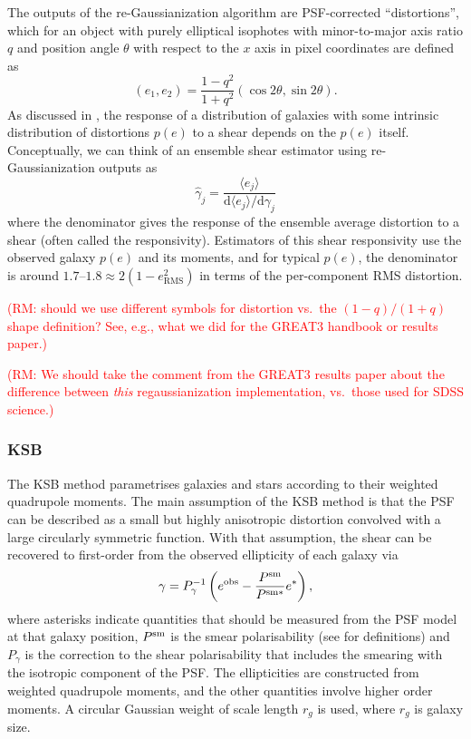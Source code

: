 \documentclass[iop]{emulateapj}
\newcommand\rmcomment[1]{\textcolor{red}{(RM: #1)}}
\begin{document}
The outputs of the re-Gaussianization algorithm are PSF-corrected
``distortions'', which for an object with purely elliptical isophotes
with minor-to-major axis ratio $q$ and position angle $\theta$ with
respect to the $x$ axis in pixel coordinates are defined as
\begin{equation}
(e_1, e_2) = \frac{1-q^2}{1+q^2}\left(\cos{2\theta},\sin{2\theta}\right).
\end{equation}
As discussed in \cite{2002AJ....123..583B}, the response of a
distribution of galaxies with some intrinsic distribution of
distortions $p(e)$ to a shear %
depends on
the $p(e)$ itself.  Conceptually, we can think of an ensemble shear
estimator using re-Gaussianization outputs as
\begin{equation}
\hat{\gamma}_j = \frac{\langle e_j\rangle}{\mathrm{d}\langle e_j\rangle/\mathrm{d}\gamma_j}
\end{equation}
where the denominator gives the response of the ensemble average
distortion to a shear (often called the responsivity).  Estimators of
this shear responsivity use the observed galaxy $p(e)$ and its
moments, and for typical $p(e)$, the denominator is around
$1.7$--$1.8\approx 2 (1-e_\text{RMS}^2)$ in terms of the per-component RMS distortion.

\rmcomment{should we use different symbols for distortion vs.\ the $(1-q)/(1+q)$ shape definition?
  See, e.g., what we did for the GREAT3 handbook or results paper.}

\rmcomment{We should take the comment from the GREAT3 results paper about the difference between
  {\em this} regaussianization implementation, vs.\ those used for SDSS science.}

\subsubsection{KSB}

The KSB method \citep{1995ApJ...449..460K} parametrises galaxies and
stars according to their weighted quadrupole moments.  The main
assumption of the KSB method is that the PSF can be described as a
small but highly anisotropic distortion convolved with a large
circularly symmetric function.  With that assumption, the shear can be
recovered to first-order from the observed ellipticity of each galaxy
via
\begin{equation} \label{eqn:weight}
\gamma=P_{\gamma}^{-1}\left(e^{\rm obs}-\frac{P^{\rm sm}}{P^{\rm sm*}}e^{*}\right),
\end{equation}
where asterisks indicate quantities that should be measured from the
PSF model at that galaxy position, $P^{\rm sm}$ is the smear
polarisability (see \citealt{2006MNRAS.368.1323H} for definitions) and
$P_\gamma$ is the correction to the shear polarisability that includes
the smearing with the isotropic component of the PSF. The
ellipticities are constructed from weighted quadrupole moments, and
the other quantities involve higher order moments. A circular Gaussian
weight of scale length $r_g$ is used, where $r_g$ is galaxy size.
\end{document}

